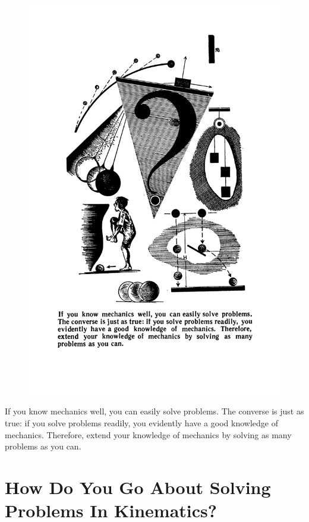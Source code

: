 \documentclass[a4paper,sfsidenotes]{tufte-book}
\begin{document}
\begin{centering}

\begin{figure}
\centering

\includegraphics[width=0.7\linewidth]{sec-b.pdf}
\end{figure}
 \addtocounter{figure}{1}
\begin{fullwidth}
\begin{Large}
If you know mechanics well, you can easily solve problems. The converse is just as true: if you solve problems readily, you evidently have a good knowledge of mechanics. Therefore, extend your knowledge of mechanics by solving as many problems as you can.
\end{Large}
\end{fullwidth}
\end{centering}


\chapter{How Do You Go About Solving Problems In Kinematics?}
\label{ch-05}
\end{document}
